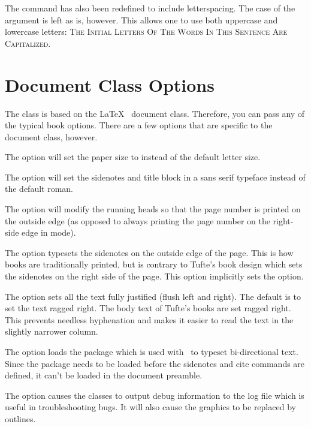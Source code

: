 The  command has also been redefined to include
letterspacing.  The case of the  argument is left as is,
however.  This allows one to use both uppercase and lowercase letters:
\textsc{The Initial Letters Of The Words In This Sentence Are Capitalized.}



\section{Document Class Options}\label{sec:options}

The  class is based on the \LaTeX\ 
document class.  Therefore, you can pass any of the typical book
options.  There are a few options that are specific to the
 document class, however.

The  option will set the paper size to  instead of
the default  letter size.

The  option will set the sidenotes and title block in a 
\textsf{sans serif} typeface instead of the default roman.

The  option will modify the running heads so that the page
number is printed on the outside edge (as opposed to always printing the page
number on the right-side edge in  mode).  

The  option typesets the sidenotes on the outside edge of
the page.  This is how books are traditionally printed, but is contrary to
Tufte's book design which sets the sidenotes on the right side of the page.
This option implicitly sets the  option.

The  option sets all the text fully justified (flush left
and right).  The default is to set the text ragged right.  
The body text of Tufte's books are set ragged right.  This prevents
needless hyphenation and makes it easier to read the text in the slightly
narrower column.

The  option loads the  package which is used with
\tXeLaTeX\ to typeset bi-directional text.  Since the 
package needs to be loaded before the sidenotes and cite commands are defined,
it can't be loaded in the document preamble.

The  option causes the \TL classes to output debug
information to the log file which is useful in troubleshooting bugs.  It will
also cause the graphics to be replaced by outlines.

